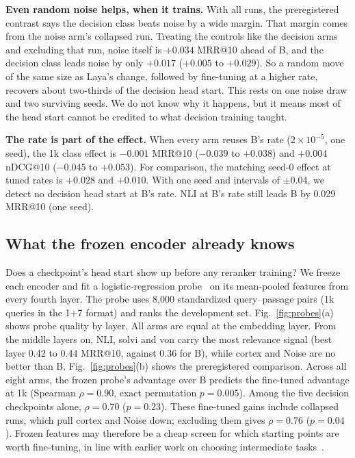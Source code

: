 \documentclass[journal]{IEEEtran}
\makeatletter
\newcommand{\ms}{MRR@10}
\newcommand{\nd}{nDCG@10}
\makeatother
\begin{document}
\textbf{Even random noise helps, when it trains.} With all runs, the preregistered contrast says the decision class beats noise by a wide margin. That margin comes from the noise arm's collapsed run. Treating the controls like the decision arms and excluding that run, noise itself is $+0.034$ \ms{} ahead of B, and the decision class leads noise by only $+0.017$ ($+0.005$ to $+0.029$). So a random move of the same size as Laya's change, followed by fine-tuning at a higher rate, recovers about two-thirds of the decision head start. This rests on one noise draw and two surviving seeds. We do not know why it happens, but it means most of the head start cannot be credited to what decision training taught.

\textbf{The rate is part of the effect.} When every arm reuses B's rate ($2\times10^{-5}$, one seed), the 1k class effect is $-0.001$ \ms{} ($-0.039$ to $+0.038$) and $+0.004$ \nd{} ($-0.045$ to $+0.053$). For comparison, the matching seed-0 effect at tuned rates is $+0.028$ and $+0.010$. With one seed and intervals of $\pm$0.04, we detect no decision head start at B's rate. NLI at B's rate still leads B by 0.029 \ms{} (one seed).

\subsection{What the frozen encoder already knows}

Does a checkpoint's head start show up before any reranker training? We freeze each encoder and fit a logistic-regression probe~\cite{alain2016probes} on its mean-pooled features from every fourth layer. The probe uses 8{,}000 standardized query--passage pairs (1k queries in the 1+7 format) and ranks the development set. Fig.~\ref{fig:probes}(a) shows probe quality by layer. All arms are equal at the embedding layer. From the middle layers on, NLI, solvi and von carry the most relevance signal (best layer 0.42 to 0.44 \ms{}, against 0.36 for B), while cortex and Noise are no better than B. Fig.~\ref{fig:probes}(b) shows the preregistered comparison. Across all eight arms, the frozen probe's advantage over B predicts the fine-tuned advantage at 1k (Spearman $\rho=0.90$, exact permutation $p=0.005$). Among the five decision checkpoints alone, $\rho=0.70$ ($p=0.23$). These fine-tuned gains include collapsed runs, which pull cortex and Noise down; excluding them gives $\rho=0.76$ ($p=0.04$). Frozen features may therefore be a cheap screen for which starting points are worth fine-tuning, in line with earlier work on choosing intermediate tasks~\cite{poth2021pretrain,kornblith2019transfer}.
\end{document}
